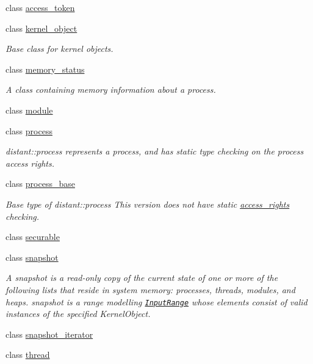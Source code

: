 \begin{DoxyCompactItemize}
\item 
class \mbox{\hyperlink{classdistant_1_1kernel__objects_1_1access__token}{access\+\_\+token}}
\item 
class \mbox{\hyperlink{classdistant_1_1kernel__objects_1_1kernel__object}{kernel\+\_\+object}}
\begin{DoxyCompactList}\small\item\em Base class for kernel objects. \end{DoxyCompactList}\item 
class \mbox{\hyperlink{classdistant_1_1kernel__objects_1_1memory__status}{memory\+\_\+status}}
\begin{DoxyCompactList}\small\item\em A class containing memory information about a process. \end{DoxyCompactList}\item 
class \mbox{\hyperlink{classdistant_1_1kernel__objects_1_1module}{module}}
\item 
class \mbox{\hyperlink{classdistant_1_1kernel__objects_1_1process}{process}}
\begin{DoxyCompactList}\small\item\em distant\+::process represents a process, and has static type checking on the process access rights. \end{DoxyCompactList}\item 
class \mbox{\hyperlink{classdistant_1_1kernel__objects_1_1process__base}{process\+\_\+base}}
\begin{DoxyCompactList}\small\item\em Base type of distant\+::process This version does not have static \mbox{\hyperlink{structdistant_1_1access__rights}{access\+\_\+rights}} checking. \end{DoxyCompactList}\item 
class \mbox{\hyperlink{classdistant_1_1kernel__objects_1_1securable}{securable}}
\item 
class \mbox{\hyperlink{classdistant_1_1kernel__objects_1_1snapshot}{snapshot}}
\begin{DoxyCompactList}\small\item\em A snapshot is a read-\/only copy of the current state of one or more of the following lists that reside in system memory\+: processes, threads, modules, and heaps. snapshot is a range modelling \href{http://en.cppreference.com/w/cpp/experimental/ranges/range/InputRange}{\tt Input\+Range} whose elements consist of valid instances of the specified {\itshape Kernel\+Object}. \end{DoxyCompactList}\item 
class \mbox{\hyperlink{classdistant_1_1kernel__objects_1_1snapshot__iterator}{snapshot\+\_\+iterator}}
\item 
class \mbox{\hyperlink{classdistant_1_1kernel__objects_1_1thread}{thread}}
\end{DoxyCompactItemize}
